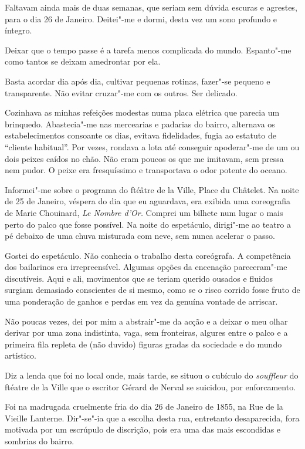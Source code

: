 Faltavam ainda mais de duas semanas, que seriam sem dúvida escuras e
agrestes, para o dia 26 de Janeiro. Deitei"-me e dormi, desta vez um sono
profundo e íntegro.

Deixar que o tempo passe é a tarefa menos complicada do mundo.
Espanto"-me como tantos se deixam amedrontar por ela.

Basta acordar dia após dia, cultivar pequenas rotinas,
fazer"-se pequeno e transparente. Não evitar cruzar"-me com os outros. Ser
delicado.

Cozinhava as minhas refeições modestas numa placa elétrica que
parecia um brinquedo. Abastecia"-me nas mercearias e padarias do bairro,
alternava os estabelecimentos consoante os dias, evitava fidelidades,
fugia ao estatuto de ``cliente habitual''. Por vezes, rondava a lota
até conseguir apoderar"-me de um ou dois peixes caídos no chão. Não eram
poucos os que me imitavam, sem pressa nem pudor. O peixe era
fresquíssimo e transportava o odor potente do oceano.

Informei"-me sobre o programa do ftéâtre de la Ville, Place du Châtelet.
Na noite de 25 de Janeiro, véspera do dia que eu aguardava, era exibida
uma coreografia de Marie Chouinard, \emph{Le Nombre d'Or. }Comprei um
bilhete num lugar o mais perto do palco que fosse possível. Na noite do
espetáculo, dirigi"-me ao teatro a pé debaixo de uma chuva misturada com
neve, sem nunca acelerar o passo.

Gostei do espetáculo. Não conhecia o trabalho desta coreógrafa. A
competência dos bailarinos era irrepreensível. Algumas opções da
encenação pareceram"-me discutíveis. Aqui e ali, movimentos que se teriam
querido ousados e fluidos surgiam demasiado conscientes de si mesmo,
como se o risco corrido fosse fruto de uma ponderação de ganhos e
perdas em vez da genuína vontade de arriscar.

Não poucas vezes, dei por mim a abstrair"-me da acção e a deixar o meu
olhar derivar por uma zona indistinta, vaga, sem fronteiras, algures
entre o palco e a primeira fila repleta de (não duvido) figuras gradas
da sociedade e do mundo artístico.

Diz a lenda que foi no local onde, mais tarde, se situou o cubículo do
\emph{souffleur }do ftéatre de la Ville que o escritor Gérard de Nerval
se suicidou, por enforcamento.

Foi na madrugada cruelmente fria do dia 26 de Janeiro de 1855, na Rue de
la Vieille Lanterne. Dir"-se"-ia que a escolha desta rua, entretanto
desaparecida, fora motivada por um escrúpulo de discrição, pois era uma
das mais escondidas e sombrias do bairro.

